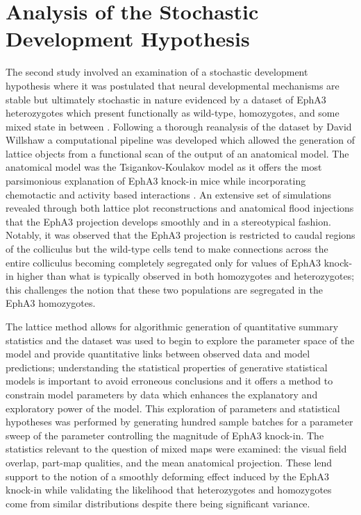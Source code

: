 \section{Analysis of the Stochastic Development Hypothesis}
The second study involved an examination of a stochastic development hypothesis where it was postulated that neural developmental mechanisms are stable but ultimately stochastic in nature evidenced by a dataset of EphA3 heterozygotes which present functionally as wild-type, homozygotes, and some mixed state in between \cite{Owens2015-zv}. Following a thorough reanalysis of the dataset by David Willshaw a computational pipeline was developed which allowed the generation of lattice objects from a functional scan of the output of an anatomical model. The anatomical model was the Tsigankov-Koulakov model as it offers the most parsimonious explanation of EphA3 knock-in mice while incorporating chemotactic and activity based interactions \cite{Triplett2011-jk, Hjorth2015-le}. An extensive set of simulations revealed through both lattice plot reconstructions and anatomical flood injections that the EphA3 projection develops smoothly and in a stereotypical fashion. Notably, it was observed that the EphA3 projection is restricted to caudal regions of the colliculus but the wild-type cells tend to make connections across the entire colliculus becoming completely segregated only for values of EphA3 knock-in higher than what is typically observed in both homozygotes and heterozygotes; this challenges the notion that these two populations are segregated in the EphA3 homozygotes. 

The lattice method allows for algorithmic generation of quantitative summary statistics and the dataset was used to begin to explore the parameter space of the model and provide quantitative links between observed data and model predictions; understanding the statistical properties of generative statistical models is important to avoid erroneous conclusions and it offers a method to constrain model parameters by data which enhances the explanatory and exploratory power of the model. This exploration of parameters and statistical hypotheses was  performed by generating hundred sample batches for a parameter sweep of the parameter controlling the magnitude of EphA3 knock-in. The statistics relevant to the question of mixed maps were examined: the visual field overlap, part-map qualities, and the mean anatomical projection. These lend support to the notion of a smoothly deforming effect induced by the EphA3 knock-in while validating the likelihood that heterozygotes and homozygotes come from similar distributions despite there being significant variance.

